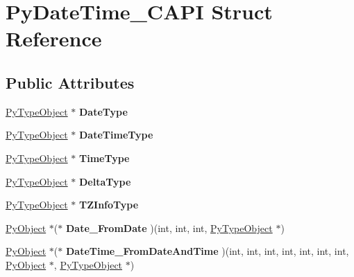 \hypertarget{structPyDateTime__CAPI}{}\section{Py\+Date\+Time\+\_\+\+C\+A\+PI Struct Reference}
\label{structPyDateTime__CAPI}
\subsection*{Public Attributes}
\begin{DoxyCompactItemize}
\item 
\hyperlink{struct__typeobject}{Py\+Type\+Object} $\ast$ {\bfseries Date\+Type}\hypertarget{structPyDateTime__CAPI_abfafd0453a7f387ab8f4365431543905}{}\label{structPyDateTime__CAPI_abfafd0453a7f387ab8f4365431543905}

\item 
\hyperlink{struct__typeobject}{Py\+Type\+Object} $\ast$ {\bfseries Date\+Time\+Type}\hypertarget{structPyDateTime__CAPI_a85f29d980c43599949a37890882e5051}{}\label{structPyDateTime__CAPI_a85f29d980c43599949a37890882e5051}

\item 
\hyperlink{struct__typeobject}{Py\+Type\+Object} $\ast$ {\bfseries Time\+Type}\hypertarget{structPyDateTime__CAPI_a14967c0f0703a60b53eee61f3a868c82}{}\label{structPyDateTime__CAPI_a14967c0f0703a60b53eee61f3a868c82}

\item 
\hyperlink{struct__typeobject}{Py\+Type\+Object} $\ast$ {\bfseries Delta\+Type}\hypertarget{structPyDateTime__CAPI_a0fb84e80d67fd689d265d94811418231}{}\label{structPyDateTime__CAPI_a0fb84e80d67fd689d265d94811418231}

\item 
\hyperlink{struct__typeobject}{Py\+Type\+Object} $\ast$ {\bfseries T\+Z\+Info\+Type}\hypertarget{structPyDateTime__CAPI_a967e1a42dd00881315101a1f09ee61c8}{}\label{structPyDateTime__CAPI_a967e1a42dd00881315101a1f09ee61c8}

\item 
\hyperlink{struct__object}{Py\+Object} $\ast$($\ast$ {\bfseries Date\+\_\+\+From\+Date} )(int, int, int, \hyperlink{struct__typeobject}{Py\+Type\+Object} $\ast$)\hypertarget{structPyDateTime__CAPI_aa87be8a59753b780632df32f8e450477}{}\label{structPyDateTime__CAPI_aa87be8a59753b780632df32f8e450477}

\item 
\hyperlink{struct__object}{Py\+Object} $\ast$($\ast$ {\bfseries Date\+Time\+\_\+\+From\+Date\+And\+Time} )(int, int, int, int, int, int, int, \hyperlink{struct__object}{Py\+Object} $\ast$, \hyperlink{struct__typeobject}{Py\+Type\+Object} $\ast$)\hypertarget{structPyDateTime__CAPI_afecc6e6c8d9e677f9242e78fe3138b12}{}\label{structPyDateTime__CAPI_afecc6e6c8d9e677f9242e78fe3138b12}


\end{DoxyCompactItemize}
